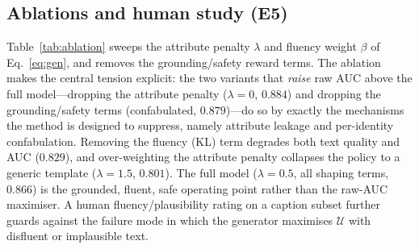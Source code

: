 \documentclass[10pt,twocolumn,letterpaper]{article}
\newcommand{\U}{\mathcal{U}}
\begin{document}
\subsection{Ablations and human study (E5)}
\label{sec:e5}
Table~\ref{tab:ablation} sweeps the attribute penalty $\lambda$ and fluency weight $\beta$ of
Eq.~\ref{eq:gen}, and removes the grounding/safety reward terms. The ablation makes the central
tension explicit: the two variants that \emph{raise} raw AUC above the full model---dropping the
attribute penalty ($\lambda{=}0$, $0.884$) and dropping the grounding/safety terms
(confabulated, $0.879$)---do so by exactly the mechanisms the method is designed to suppress,
namely attribute leakage and per-identity confabulation. Removing the fluency (KL) term degrades
both text quality and AUC ($0.829$), and over-weighting the attribute penalty collapses the
policy to a generic template ($\lambda{=}1.5$, $0.801$). The full model ($\lambda{=}0.5$, all
shaping terms, $0.866$) is the grounded, fluent, safe operating point rather than the raw-AUC
maximiser. A human fluency/plausibility rating on a caption subset further guards against the
failure mode in which the generator maximises $\U$ with disfluent or implausible text.
\end{document}
